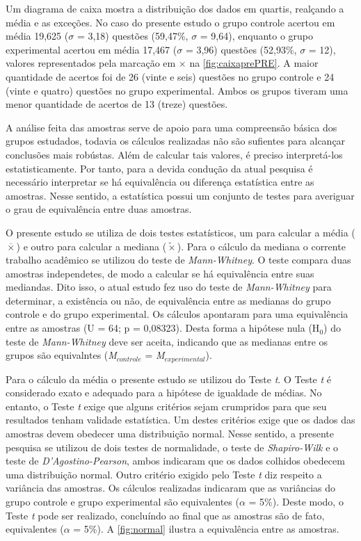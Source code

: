 Um diagrama de caixa mostra a distribuição dos dados em quartis, realçando a média e as exceções. No caso do presente estudo o grupo controle acertou em média 19,625 ($\sigma$ = 3,18) questões (59,47\%, $\sigma$ = 9,64), enquanto o grupo experimental acertou em média 17,467 ($\sigma$ = 3,96) questões (52,93\%, $\sigma$ = 12), valores representados pela marcação em $\times$ na \autoref{fig:caixaprePRE}. A maior quantidade de acertos foi de 26 (vinte e seis) questões no grupo controle e 24 (vinte e quatro) questões no grupo experimental. Ambos os grupos tiveram uma menor quantidade de acertos de 13 (treze) questões.

A análise feita das amostras serve de apoio para uma compreensão básica dos grupos estudados, todavia os cálculos realizadas não são sufientes para alcançar conclusões mais robústas. Além de calcular tais valores, é preciso interpretá-los estatisticamente. Por tanto, para a devida condução da atual pesquisa é necessário interpretar se há equivalência ou diferença estatística entre as amostras. Nesse sentido, a estatística possui um conjunto de testes para averiguar o grau de equivalência entre duas amostras. %

O presente estudo se utiliza de dois testes estatísticos, um para calcular a média ($\overline{\times}$) e outro para calcular a mediana ($\tilde{\times}$). Para o cálculo da mediana o corrente trabalho acadêmico se utilizou do teste de \textit{Mann-Whitney}. O teste compara duas amostras independetes, de modo a calcular se há equivalência entre suas mediandas. Dito isso, o atual estudo fez uso do teste de \textit{Mann-Whitney} para determinar, a existência ou não, de equivalência entre as medianas do grupo controle e do grupo experimental. Os cálculos apontaram para uma equivalência entre as amostras (U = 64; p = 0,08323). Desta forma a hipótese nula (H$_0$) do teste de \textit{Mann-Whitney} deve ser aceita, indicando que as medianas entre os grupos são equivalntes (\textit{M}$_{controle}$ = \textit{M}$_{experimental}$). %

Para o cálculo da média o presente estudo se utilizou do Teste \textit{t}. O Teste \textit{t} é considerado exato e adequado para a hipótese de igualdade de médias. No entanto, o Teste \textit{t} exige que alguns critérios sejam crumpridos para que seu resultados tenham validade estatística. Um destes critérios exige que os dados das amostras devem obedecer uma distribuição normal. Nesse sentido, a presente pesquisa se utilizou de dois testes de normalidade, o teste de \textit{Shapiro-Wilk} e o teste de \textit{D'Agostino-Pearson}, ambos indicaram que  os dados colhidos obedecem uma distribuição normal. Outro critério exigido pelo Teste \textit{t} diz respeito a variância das amostras. Os cálculos realizadas indicaram que as variâncias do grupo controle e grupo experimental são equivalentes ($\alpha$ = 5\%). Deste modo, o Teste \textit{t} pode ser realizado, concluíndo ao final que as amostras são de fato, equivalentes ($\alpha$ = 5\%). A \autoref{fig:normal} ilustra a equivalência entre as amostras. 

